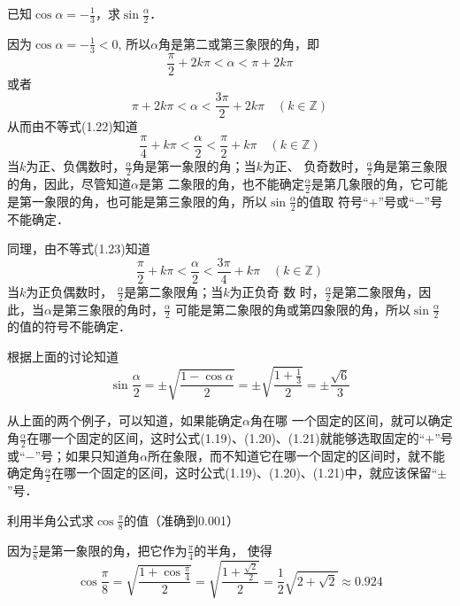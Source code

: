 \begin{example}
    已知$\cos\alpha=-\frac{1}{3}$，求$\sin\frac{\alpha}{2}$．
\end{example}

\begin{solution}
因为$\cos\alpha=-\frac{1}{3}<0$, 所以$\alpha$角是第二或第三象限的角，即
\begin{equation}
    \frac{\pi}{2}+2k\pi<\alpha<\pi+2k\pi
\end{equation}
或者
\begin{equation}
    \pi+2k\pi<\alpha<\frac{3\pi}{2}+2k\pi\quad (k\in\mathbb{Z})
\end{equation}
从而由不等式(1.22)知道
\[\frac{\pi}{4}+k\pi<\frac{\alpha}{2}<\frac{\pi}{2}+k\pi \quad (k\in\mathbb{Z}) \]
当$k$为正、负偶数时，$\frac{\alpha}{2}$角是第一象限的角；当$k$为正、
负奇数时，$\frac{\alpha}{2}$角是第三象限的角，因此，尽管知道$\alpha$是第
二象限的角，也不能确定$\frac{\alpha}{2}$是第几象限的角，它可能是第一象限的角，也可能是第三象限的角，所以$\sin \frac{\alpha}{2}$的值取
符号“$+$”号或“$-$”号不能确定．

同理，由不等式(1.23)知道
\[\frac{\pi}{2}+k\pi<\frac{\alpha}{2}<\frac{3\pi}{4}+k\pi\quad (k\in\mathbb{Z})\]
当$k$为正负偶数时，
$\frac{\alpha}{2}$是第二象限角；当$k$为正负奇 数
时，$\frac{\alpha}{2}$是第二象限角，因此，当$\alpha$是第三象限的角时，$\frac{\alpha}{2}$
可能是第二象限的角或第四象限的角，所以$\sin\frac{\alpha}{2}$
的值的符号不能确定．

根据上面的讨论知道
\[\sin\frac{\alpha}{2}=\pm\sqrt{\frac{1-\cos\alpha}{2}}=\pm\sqrt{\frac{1+\frac{1}{3}}{2}}=\pm\frac{\sqrt{6}}{3}\]
\end{solution}

从上面的两个例子，可以知道，如果能确定$\alpha$角在哪
一个固定的区间，就可以确定角$\frac{\alpha}{2}$在哪一个固定的区间，这时公式(1.19)、(1.20)、(1.21)就能够选取固定的“$+$”号或“$-$”号；如果只知道角$\alpha$所在象限，而不知道它在哪一个固定的区间时，就不能确定角$\frac{\alpha}{2}$在哪一个固定的区间，这时公式(1.19)、(1.20)、(1.21)中，就应该保留“$\pm$”号．
    

\begin{example}
    利用半角公式求$\cos\frac{\pi}{8}$的值（准确到0.001）
\end{example}

\begin{solution}
    因为$\frac{\pi}{8}$是第一象限的角，把它作为$\frac{\pi}{4}$的半角，
    使得
\[\cos\frac{\pi}{8}=\sqrt{\frac{1+\cos\frac{\pi}{4}}{2}}=\sqrt{\frac{1+\frac{\sqrt{2}}{2}}{2}}=\frac{1}{2}\sqrt{2+\sqrt{2}}\approx 0.924\]
\end{solution}


